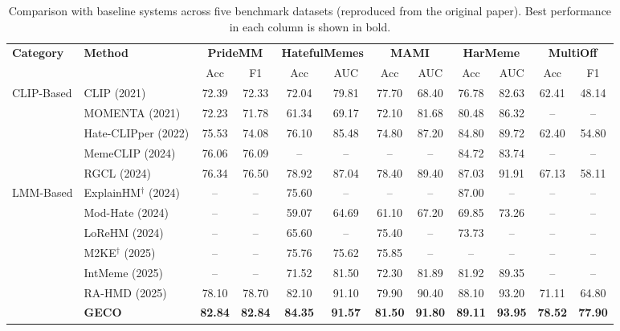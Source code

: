 \documentclass[manuscript,review]{acmart}
\begin{document}
\begin{table}[t]
\centering
\caption{Comparison with baseline systems across five benchmark datasets (reproduced from
the original paper). Best performance in each column is shown in bold.}
\label{tab:main-results}
\begin{tabular}{ll|cc|cc|cc|cc|cc}
\toprule
\textbf{Category} & \textbf{Method} & \multicolumn{2}{c|}{\textbf{PrideMM}} & \multicolumn{2}{c|}{\textbf{HatefulMemes}} & \multicolumn{2}{c|}{\textbf{MAMI}} & \multicolumn{2}{c|}{\textbf{HarMeme}} & \multicolumn{2}{c}{\textbf{MultiOff}} \\
 & & Acc & F1 & Acc & AUC & Acc & AUC & Acc & AUC & Acc & F1 \\
\midrule
\multirow{5}{*}{CLIP-Based}
 & CLIP (2021)         & 72.39 & 72.33 & 72.04 & 79.81 & 77.70 & 68.40 & 76.78 & 82.63 & 62.41 & 48.14 \\
 & MOMENTA (2021)      & 72.23 & 71.78 & 61.34 & 69.17 & 72.10 & 81.68 & 80.48 & 86.32 & --    & --    \\
 & Hate-CLIPper (2022) & 75.53 & 74.08 & 76.10 & 85.48 & 74.80 & 87.20 & 84.80 & 89.72 & 62.40 & 54.80 \\
 & MemeCLIP (2024)     & 76.06 & 76.09 & --    & --    & --    & --    & 84.72 & 83.74 & --    & --    \\
 & RGCL (2024)         & 76.34 & 76.50 & 78.92 & 87.04 & 78.40 & 89.40 & 87.03 & 91.91 & 67.13 & 58.11 \\
\midrule
\multirow{6}{*}{LMM-Based}
 & ExplainHM$^\dagger$ (2024) & --    & --    & 75.60 & --    & --    & --    & 87.00 & --    & --    & --    \\
 & Mod-Hate (2024)     & --    & --    & 59.07 & 64.69 & 61.10 & 67.20 & 69.85 & 73.26 & --    & --    \\
 & LoReHM (2024)       & --    & --    & 65.60 & --    & 75.40 & --    & 73.73 & --    & --    & --    \\
 & M2KE$^\dagger$ (2025) & --  & --    & 75.76 & 75.62 & 75.85 & --    & --    & --    & --    & --    \\
 & IntMeme (2025)      & --    & --    & 71.52 & 81.50 & 72.30 & 81.89 & 81.92 & 89.35 & --    & --    \\
 & RA-HMD (2025)       & 78.10 & 78.70 & 82.10 & 91.10 & 79.90 & 90.40 & 88.10 & 93.20 & 71.11 & 64.80 \\
\midrule
 & \textbf{GECO}       & \textbf{82.84} & \textbf{82.84} & \textbf{84.35} & \textbf{91.57} & \textbf{81.50} & \textbf{91.80} & \textbf{89.11} & \textbf{93.95} & \textbf{78.52} & \textbf{77.90} \\
\bottomrule
\end{tabular}
\end{table}
\end{document}
